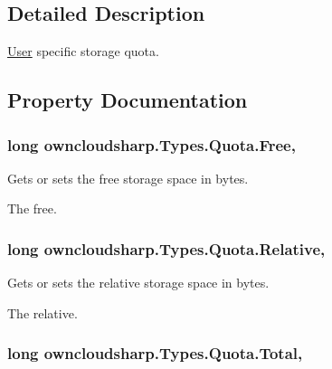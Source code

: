 \subsection{Detailed Description}
\hyperlink{classowncloudsharp_1_1_types_1_1_user}{User} specific storage quota. 



\subsection{Property Documentation}
\hypertarget{classowncloudsharp_1_1_types_1_1_quota_ac91c3c7f5b5e8a4ca9250755bfd9a7e6}{}
\subsubsection[{Free}]{\setlength{\rightskip}{0pt plus 5cm}long owncloudsharp.\+Types.\+Quota.\+Free\hspace{0.3cm}{\ttfamily [get]}, {\ttfamily [set]}}\label{classowncloudsharp_1_1_types_1_1_quota_ac91c3c7f5b5e8a4ca9250755bfd9a7e6}


Gets or sets the free storage space in bytes. 

The free.\hypertarget{classowncloudsharp_1_1_types_1_1_quota_a6cfa2b67310f3eb74174594ab61a4bef}{}
\subsubsection[{Relative}]{\setlength{\rightskip}{0pt plus 5cm}long owncloudsharp.\+Types.\+Quota.\+Relative\hspace{0.3cm}{\ttfamily [get]}, {\ttfamily [set]}}\label{classowncloudsharp_1_1_types_1_1_quota_a6cfa2b67310f3eb74174594ab61a4bef}


Gets or sets the relative storage space in bytes. 

The relative.\hypertarget{classowncloudsharp_1_1_types_1_1_quota_af9707557b6c95b2ffaf874dc25c4609d}{}
\subsubsection[{Total}]{\setlength{\rightskip}{0pt plus 5cm}long owncloudsharp.\+Types.\+Quota.\+Total\hspace{0.3cm}{\ttfamily [get]}, {\ttfamily [set]}}\label{classowncloudsharp_1_1_types_1_1_quota_af9707557b6c95b2ffaf874dc25c4609d}


